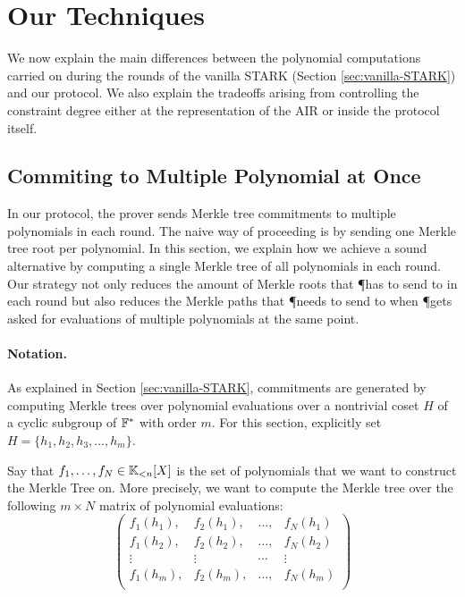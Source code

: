 \section{Our Techniques}\label{sec:our-techniques}

We now explain the main differences between the polynomial computations carried on during the rounds of the vanilla STARK (Section \ref{sec:vanilla-STARK}) and our protocol. We also explain the tradeoffs arising from controlling the constraint degree either at the representation of the AIR or inside the protocol itself.


\subsection{Commiting to Multiple Polynomial at Once}\label{sec:committing}

In our protocol, the prover sends Merkle tree commitments to multiple polynomials in each round. The naive way of proceeding is by sending one Merkle tree root per polynomial. In this section, we explain how we achieve a sound alternative by computing a single Merkle tree of all polynomials in each round. Our strategy not only reduces the amount of Merkle roots that \P has to send to \V in each round but also reduces the Merkle paths that \P needs to send to \V when \P gets asked for evaluations of multiple polynomials at the same point.

\paragraph*{Notation.} As explained in Section \ref{sec:vanilla-STARK}, commitments are generated by computing Merkle trees over polynomial evaluations over a nontrivial coset $H$ of a cyclic subgroup of $\mathbb{F}^*$ with order $m$. For this section, explicitly set $H = \{h_1,h_2,h_3,\dots,h_m\}$.

Say that $f_1,\dots,f_N \in \mathbb{K}_{<n}[X]$ is the set of polynomials that we want to construct the Merkle Tree on. More precisely, we want to compute the Merkle tree over the following $m \times N$ matrix of polynomial evaluations:
\[
\left(
\begin{array}{cccc}
f_1(h_1), & f_2(h_1), &\dots, &f_N(h_1) \\[0.1cm]
f_1(h_2), & f_2(h_2), &\dots, &f_N(h_2) \\
\vdots &\vdots &\cdots & \vdots \\
f_1(h_m), & f_2(h_m), & \dots, &f_N(h_m) \\
\end{array}
\right)
\]

